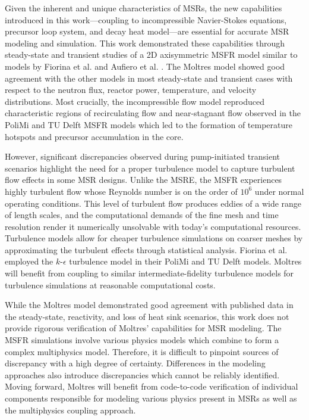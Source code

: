 Given the inherent and unique characteristics of \glspl{MSR}, the new
capabilities introduced in this work---coupling to incompressible Navier-Stokes
equations, precursor loop system, and decay heat model---are essential for
accurate \gls{MSR} modeling and simulation. This work demonstrated these
capabilities through steady-state and transient studies of a 2D axisymmetric
\gls{MSFR} model similar to models by Fiorina et al.
\cite{fiorina_modelling_2014} and Aufiero et al.
\cite{aufiero_development_2014}. The Moltres model showed good agreement with
the other models in
most steady-state and transient cases with respect to the neutron flux, reactor
power, temperature, and velocity distributions. Most crucially, the
incompressible flow model reproduced characteristic regions of recirculating
flow and near-stagnant flow observed in the PoliMi and TU Delft \gls{MSFR}
models which led to the formation of temperature hotspots and precursor
accumulation in the core.

However, significant discrepancies observed during pump-initiated transient
scenarios highlight the need for a proper turbulence model to capture
turbulent flow effects in some \gls{MSR} designs. Unlike the \gls{MSRE}, the
\gls{MSFR} experiences highly turbulent flow whose Reynolds number is on the
order of $10^6$ under normal operating conditions. This level of turbulent flow
produces eddies of a wide range of length scales, and the computational demands
of the fine mesh and time resolution render it numerically unsolvable with
today's computational resources. Turbulence models allow for cheaper turbulence
simulations on coarser meshes by approximating the turbulent effects through
statistical analysis. Fiorina et al. \cite{fiorina_modelling_2014} employed the
$k$-$\epsilon$ turbulence model in their PoliMi and TU Delft models. Moltres
will benefit from coupling to similar intermediate-fidelity turbulence models
for turbulence simulations at reasonable computational costs.

While the Moltres model demonstrated good agreement with published data in the
steady-state, reactivity, and loss of heat sink scenarios, this work does not
provide rigorous verification of Moltres' capabilities for \gls{MSR} modeling.
The \gls{MSFR} simulations involve various physics models which combine to form
a complex multiphysics model. Therefore, it is difficult to pinpoint sources of
discrepancy with a high degree of certainty. Differences in the modeling
approaches also introduce discrepancies which cannot be reliably identified.
Moving forward, Moltres will benefit from code-to-code verification of
individual components responsible for modeling various physics present in
\glspl{MSR} as well as the multiphysics coupling approach.
